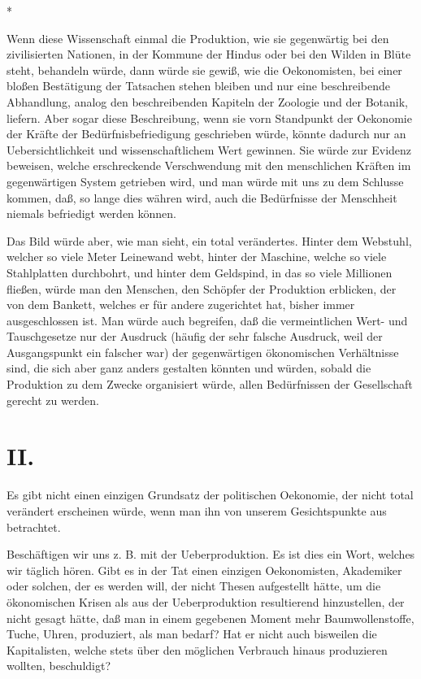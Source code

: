 \documentclass{scrbook}
\begin{document}
\begin{center}*\end{center}

Wenn diese Wissenschaft einmal die Produktion, wie sie gegenwärtig bei den zivilisierten Nationen, in der Kommune der Hindus oder bei den Wilden in Blüte steht, behandeln würde, dann würde sie gewiß, wie die Oekonomisten, bei einer bloßen Bestätigung der Tatsachen stehen bleiben und nur eine beschreibende Abhandlung, analog den beschreibenden Kapiteln der Zoologie und der Botanik, liefern. Aber sogar diese Beschreibung, wenn sie vorn Standpunkt der Oekonomie der Kräfte der Bedürfnisbefriedigung geschrieben würde, könnte dadurch nur an Uebersichtlichkeit und wissenschaftlichem Wert gewinnen. Sie würde zur Evidenz beweisen, welche erschreckende Verschwendung mit den menschlichen Kräften im gegenwärtigen System getrieben wird, und man würde mit uns zu dem Schlusse kommen, daß, so lange dies währen wird, auch die Bedürfnisse der Menschheit niemals befriedigt werden können.

Das Bild würde aber, wie man sieht, ein total verändertes. Hinter dem Webstuhl, welcher so viele Meter Leinewand webt, hinter der Maschine, welche so viele Stahlplatten durchbohrt, und hinter dem Geldspind, in das so viele Millionen fließen, würde man den Menschen, den Schöpfer der Produktion erblicken, der von dem Bankett, welches er für andere zugerichtet hat, bisher immer ausgeschlossen ist. Man würde auch begreifen, daß die vermeintlichen Wert- und Tauschgesetze nur der Ausdruck (häufig der sehr falsche Ausdruck, weil der Ausgangspunkt ein falscher war) der gegenwärtigen ökonomischen Verhältnisse sind, die sich aber ganz anders gestalten könnten und würden, sobald die Produktion zu dem Zwecke organisiert würde, allen Bedürfnissen der Gesellschaft gerecht zu werden.

\section*{II.}

Es gibt nicht einen einzigen Grundsatz der politischen Oekonomie, der nicht total verändert erscheinen würde, wenn man ihn von unserem Gesichtspunkte aus betrachtet.

Beschäftigen wir uns z. B. mit der Ueberproduktion. Es ist dies ein Wort, welches wir täglich hören. Gibt es in der Tat einen einzigen Oekonomisten, Akademiker oder solchen, der es werden will, der nicht Thesen aufgestellt hätte, um die ökonomischen Krisen als aus der Ueberproduktion resultierend hinzustellen, der nicht gesagt hätte, daß man in einem gegebenen Moment mehr Baumwollenstoffe, Tuche, Uhren, produziert, als man bedarf? Hat er nicht auch bisweilen die Kapitalisten, welche stets über den möglichen Verbrauch hinaus produzieren wollten, beschuldigt?
\end{document}
